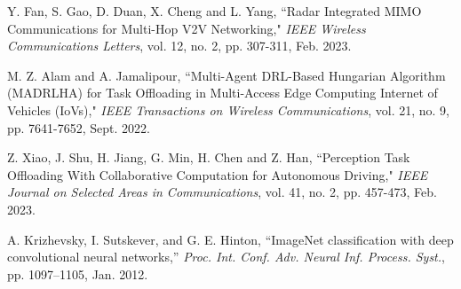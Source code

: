 \documentclass[lettersize,journal]{IEEEtran}
\begin{document}
\begin{thebibliography}{10}
Y. Fan, S. Gao, D. Duan, X. Cheng and L. Yang, ``Radar Integrated MIMO Communications for Multi-Hop V2V Networking," \textit{IEEE Wireless Communications Letters}, vol. 12, no. 2, pp. 307-311, Feb. 2023.

M. Z. Alam and A. Jamalipour, ``Multi-Agent DRL-Based Hungarian Algorithm (MADRLHA) for Task Offloading in Multi-Access Edge Computing Internet of Vehicles (IoVs)," \textit{IEEE Transactions on Wireless Communications}, vol. 21, no. 9, pp. 7641-7652, Sept. 2022.

Z. Xiao, J. Shu, H. Jiang, G. Min, H. Chen and Z. Han, ``Perception Task Offloading With Collaborative Computation for Autonomous Driving," \textit{IEEE Journal on Selected Areas in Communications}, vol. 41, no. 2, pp. 457-473, Feb. 2023.

A. Krizhevsky, I. Sutskever, and G. E. Hinton, ``ImageNet classification with deep convolutional neural networks,” \textit{Proc. Int. Conf. Adv. Neural Inf. Process. Syst.}, pp. 1097–1105, Jan. 2012.









\end{thebibliography}
\end{document}
